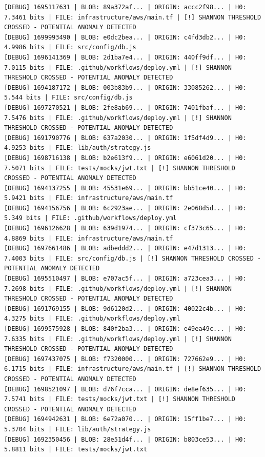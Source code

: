 \documentclass[12pt, a4paper, oneside]{report}
\begin{document}
\newpage
\begin{lstlisting}[basicstyle=\tiny\ttfamily]
[DEBUG] 1695117631 | BLOB: 89a372af... | ORIGIN: accc2f98... | H0: 7.3461 bits | FILE: infrastructure/aws/main.tf | [!] SHANNON THRESHOLD CROSSED - POTENTIAL ANOMALY DETECTED
[DEBUG] 1699993490 | BLOB: e0dc2bea... | ORIGIN: c4fd3db2... | H0: 4.9986 bits | FILE: src/config/db.js
[DEBUG] 1696141369 | BLOB: 2d1ba7e4... | ORIGIN: 440ff9df... | H0: 7.0115 bits | FILE: .github/workflows/deploy.yml | [!] SHANNON THRESHOLD CROSSED - POTENTIAL ANOMALY DETECTED
[DEBUG] 1694187172 | BLOB: 003b83b9... | ORIGIN: 33085262... | H0: 5.544 bits | FILE: src/config/db.js
[DEBUG] 1697270521 | BLOB: 2fe8ab69... | ORIGIN: 7401fbaf... | H0: 7.5476 bits | FILE: .github/workflows/deploy.yml | [!] SHANNON THRESHOLD CROSSED - POTENTIAL ANOMALY DETECTED
[DEBUG] 1691790776 | BLOB: 637a2030... | ORIGIN: 1f5df4d9... | H0: 4.9253 bits | FILE: lib/auth/strategy.js
[DEBUG] 1698716138 | BLOB: b2e613f9... | ORIGIN: e6061d20... | H0: 7.5071 bits | FILE: tests/mocks/jwt.txt | [!] SHANNON THRESHOLD CROSSED - POTENTIAL ANOMALY DETECTED
[DEBUG] 1694137255 | BLOB: 45531e69... | ORIGIN: bb51ce40... | H0: 5.9421 bits | FILE: infrastructure/aws/main.tf
[DEBUG] 1694156756 | BLOB: 6c2923ae... | ORIGIN: 2e068d5d... | H0: 5.349 bits | FILE: .github/workflows/deploy.yml
[DEBUG] 1696126628 | BLOB: 639d1974... | ORIGIN: cf373c65... | H0: 4.8869 bits | FILE: infrastructure/aws/main.tf
[DEBUG] 1697661486 | BLOB: adbeddd2... | ORIGIN: e47d1313... | H0: 7.4003 bits | FILE: src/config/db.js | [!] SHANNON THRESHOLD CROSSED - POTENTIAL ANOMALY DETECTED
[DEBUG] 1695510497 | BLOB: e707ac5f... | ORIGIN: a723cea3... | H0: 7.2698 bits | FILE: .github/workflows/deploy.yml | [!] SHANNON THRESHOLD CROSSED - POTENTIAL ANOMALY DETECTED
[DEBUG] 1691769155 | BLOB: 9d6120d2... | ORIGIN: 40022c4b... | H0: 4.3275 bits | FILE: .github/workflows/deploy.yml
[DEBUG] 1699575928 | BLOB: 840f2ba3... | ORIGIN: e49ea49c... | H0: 7.6335 bits | FILE: .github/workflows/deploy.yml | [!] SHANNON THRESHOLD CROSSED - POTENTIAL ANOMALY DETECTED
[DEBUG] 1697437075 | BLOB: f7320000... | ORIGIN: 727662e9... | H0: 6.1715 bits | FILE: infrastructure/aws/main.tf | [!] SHANNON THRESHOLD CROSSED - POTENTIAL ANOMALY DETECTED
[DEBUG] 1698521097 | BLOB: d76f7cca... | ORIGIN: de8ef635... | H0: 7.5741 bits | FILE: tests/mocks/jwt.txt | [!] SHANNON THRESHOLD CROSSED - POTENTIAL ANOMALY DETECTED
[DEBUG] 1694942631 | BLOB: 6e72a070... | ORIGIN: 15ff1be7... | H0: 5.3704 bits | FILE: lib/auth/strategy.js
[DEBUG] 1692350456 | BLOB: 28e51d4f... | ORIGIN: b803ce53... | H0: 5.8811 bits | FILE: tests/mocks/jwt.txt

\end{lstlisting}
\end{document}
